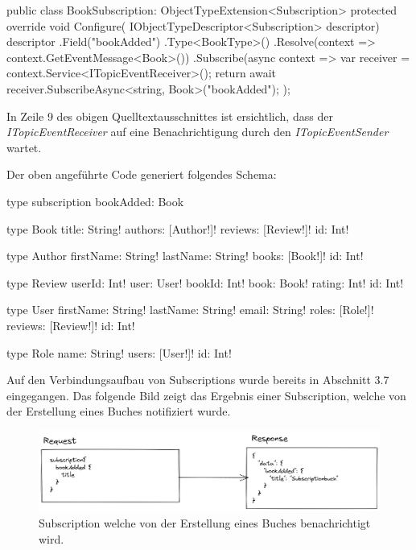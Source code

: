 \begin{JsCode}
public class BookSubscription: ObjectTypeExtension<Subscription> {
    protected override void Configure(
        IObjectTypeDescriptor<Subscription> descriptor)
    {
        descriptor
        .Field("bookAdded")
        .Type<BookType>()
        .Resolve(context => context.GetEventMessage<Book>())
        .Subscribe(async context => {
            var receiver = context.Service<ITopicEventReceiver>();
            return await receiver.SubscribeAsync<string, Book>("bookAdded");
        });
    }
}    
\end{JsCode}
In Zeile 9 des obigen Quelltextausschnittes ist ersichtlich, dass der \textit{ITopicEventReceiver} auf eine Benachrichtigung durch den \textit{ITopicEventSender} wartet.

Der oben angeführte Code generiert folgendes Schema:
\begin{JsCode}
type subscription{
    bookAdded: Book
}

type Book {
  title: String!
  authors: [Author!]!
  reviews: [Review!]!
  id: Int!
}

type Author {
  firstName: String!
  lastName: String!
  books: [Book!]!
  id: Int!
}

type Review {
  userId: Int!
  user: User!
  bookId: Int!
  book: Book!
  rating: Int!
  id: Int!
}

type User {
  firstName: String!
  lastName: String!
  email: String!
  roles: [Role!]!
  reviews: [Review!]!
  id: Int!
}

type Role {
  name: String!
  users: [User!]!
  id: Int!
}
\end{JsCode}

Auf den Verbindungsaufbau von Subscriptions wurde bereits in Abschnitt 3.7 eingegangen.
Das folgende Bild zeigt das Ergebnis einer Subscription, welche von der Erstellung eines Buches notifiziert wurde.

\begin{figure}[H]
    \includegraphics[width=\textwidth]{pics/bookSubscription.png}
    \caption{Subscription welche von der Erstellung eines Buches benachrichtigt wird.}
\end{figure}

